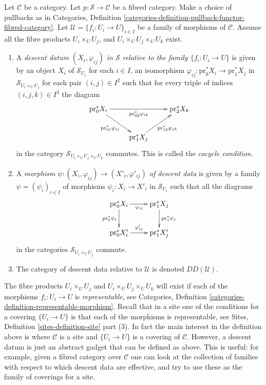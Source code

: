 \begin{definition}
\label{definition-descent-data}
Let $\mathcal{C}$ be a category.
Let $p : \mathcal{S} \to \mathcal{C}$ be a fibred category.
Make a choice of pullbacks as in Categories,
Definition \ref{categories-definition-pullback-functor-fibred-category}.
Let $\mathcal{U} = \{f_i : U_i \to U\}_{i \in I}$
be a family of morphisms of $\mathcal{C}$. Assume all the fibre products
$U_i \times_U U_j$, and $U_i \times_U U_j \times_U U_k$ exist.
\begin{enumerate}
\item A {\it descent datum $(X_i, \varphi_{ij})$ in $\mathcal{S}$
relative to the family $\{f_i : U_i \to U\}$} is given by an object $X_i$
of $\mathcal{S}_{U_i}$ for each $i \in I$, an isomorphism
$\varphi_{ij} : \text{pr}_0^*X_i \to \text{pr}_1^*X_j$
in $\mathcal{S}_{U_i \times_U U_j}$ for each pair $(i, j) \in I^2$
such that for every triple of indices $(i, j, k) \in I^3$ the
diagram
$$
\xymatrix{
\text{pr}_0^*X_i \ar[rd]_{\text{pr}_{01}^*\varphi_{ij}}
\ar[rr]_{\text{pr}_{02}^*\varphi_{ik}} & &
\text{pr}_2^*X_k \\
& \text{pr}_1^*X_j \ar[ru]_{\text{pr}_{12}^*\varphi_{jk}} &
}
$$
in the category $\mathcal{S}_{U_i \times_U U_j \times_U U_k}$
commutes. This is called the {\it cocycle condition}.
\item A {\it morphism $\psi : (X_i, \varphi_{ij}) \to
(X'_i, \varphi'_{ij})$ of descent data} is given
by a family $\psi = (\psi_i)_{i\in I}$ of morphisms
$\psi_i : X_i \to X'_i$ in $\mathcal{S}_{U_i}$
such that all the diagrams
$$
\xymatrix{
\text{pr}_0^*X_i \ar[r]_{\varphi_{ij}} \ar[d]_{\text{pr}_0^*\psi_i}
& \text{pr}_1^*X_j \ar[d]^{\text{pr}_1^*\psi_j} \\
\text{pr}_0^*X'_i \ar[r]^{\varphi'_{ij}} &
\text{pr}_1^*X'_j \\
}
$$
in the categories $\mathcal{S}_{U_i \times_U U_j}$ commute.
\item The category of descent data relative to
$\mathcal{U}$ is denoted $DD(\mathcal{U})$.
\end{enumerate}
\end{definition}

\noindent
The fibre products $U_i \times_U U_j$ and $U_i \times_U U_j \times_U U_k$
will exist if each of the morphisms $f_i : U_i \to U$ is {\it representable},
see Categories, Definition \ref{categories-definition-representable-morphism}.
Recall that in a site one of the conditions for a covering $\{U_i \to U\}$ is
that each of the morphisms is representable, see
Sites, Definition \ref{sites-definition-site} part (3).
In fact the main interest in the definition above is where $\mathcal{C}$
is a site and $\{U_i \to U\}$ is a covering of $\mathcal{C}$. However,
a descent datum is just an abstract gadget that can be defined as above.
This is useful: for example, given a fibred category over $\mathcal{C}$
one can look at the collection of families with respect to which descent data
are effective, and try to use these as the family of coverings for a site.

